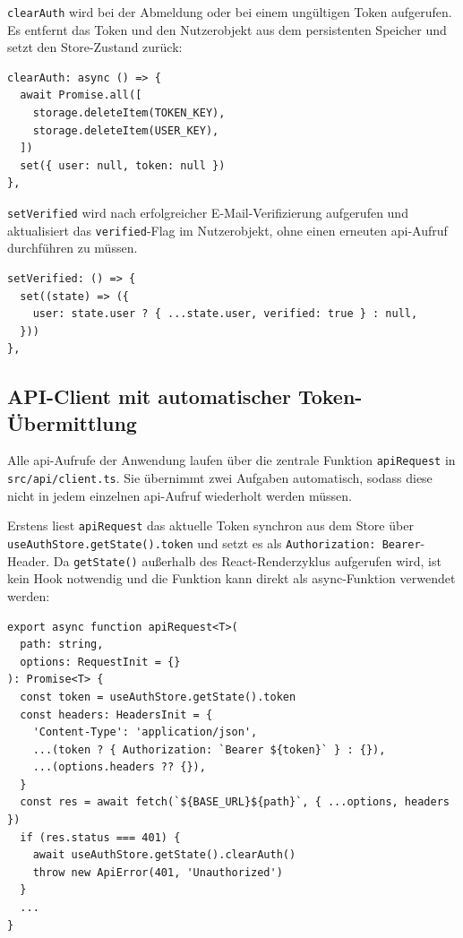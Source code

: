 \texttt{clearAuth} wird bei der Abmeldung oder bei einem ungültigen Token aufgerufen. Es
entfernt das Token und den Nutzerobjekt aus dem persistenten Speicher und setzt den Store-Zustand zurück:

\begin{listing}[H]
\begin{verbatim}
clearAuth: async () => {
  await Promise.all([
    storage.deleteItem(TOKEN_KEY),
    storage.deleteItem(USER_KEY),
  ])
  set({ user: null, token: null })
},
\end{verbatim}
\caption{Löschen des Tokens und Nutzerobjekt bei Abmeldung}
\label{lst:clear-auth}
\end{listing}

\texttt{setVerified} wird nach erfolgreicher E-Mail-Verifizierung aufgerufen und aktualisiert
das \texttt{verified}-Flag im Nutzerobjekt, ohne einen erneuten \gls{api}-Aufruf durchführen zu müssen.

\begin{listing}[H]
\begin{verbatim}
setVerified: () => {
  set((state) => ({
    user: state.user ? { ...state.user, verified: true } : null,
  }))
},
\end{verbatim}
\caption{Verified-Flag im Nutzerobjekt setzen}
\label{lst:set-verified}
\end{listing}

\subsection{API-Client mit automatischer Token-Übermittlung}

Alle \gls{api}-Aufrufe der Anwendung laufen über die zentrale Funktion \texttt{apiRequest} in
\texttt{src/api/client.ts}. Sie übernimmt zwei Aufgaben automatisch, sodass diese nicht
in jedem einzelnen \gls{api}-Aufruf wiederholt werden müssen.

Erstens liest \texttt{apiRequest} das aktuelle Token synchron aus dem Store über
\texttt{useAuthStore.getState().token} und setzt es als \texttt{Authorization: Bearer}-Header.
Da \texttt{getState()} außerhalb des React-Renderzyklus aufgerufen wird, ist kein Hook
notwendig und die Funktion kann direkt als  async-Funktion verwendet werden:

\begin{listing}[H]
\begin{verbatim}
export async function apiRequest<T>(
  path: string,
  options: RequestInit = {}
): Promise<T> {
  const token = useAuthStore.getState().token
  const headers: HeadersInit = {
    'Content-Type': 'application/json',
    ...(token ? { Authorization: `Bearer ${token}` } : {}),
    ...(options.headers ?? {}),
  }
  const res = await fetch(`${BASE_URL}${path}`, { ...options, headers })
  if (res.status === 401) {
    await useAuthStore.getState().clearAuth()
    throw new ApiError(401, 'Unauthorized')
  }
  ...
}
\end{verbatim}
\caption{Token-Injection und 401-Handling in apiRequest}
\label{lst:api-request}
\end{listing}

